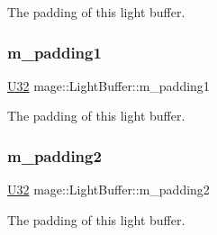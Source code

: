 The padding of this light buffer. \hypertarget{structmage_1_1_light_buffer_ac300e3454170680db1e290537fbf4a11}{}\label{structmage_1_1_light_buffer_ac300e3454170680db1e290537fbf4a11} 
\subsubsection{\texorpdfstring{m\+\_\+padding1}{m\_padding1}}
{\footnotesize\ttfamily \hyperlink{namespacemage_a41c104c036fba3756a74e19f793eeaa1}{U32} mage\+::\+Light\+Buffer\+::m\+\_\+padding1}

The padding of this light buffer. \hypertarget{structmage_1_1_light_buffer_acb9ba3e74a2d5f3344f573d9236496ef}{}\label{structmage_1_1_light_buffer_acb9ba3e74a2d5f3344f573d9236496ef} 
\subsubsection{\texorpdfstring{m\+\_\+padding2}{m\_padding2}}
{\footnotesize\ttfamily \hyperlink{namespacemage_a41c104c036fba3756a74e19f793eeaa1}{U32} mage\+::\+Light\+Buffer\+::m\+\_\+padding2}

The padding of this light buffer. 